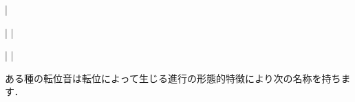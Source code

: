 \documentclass[dvipdfmx,uplatex,b5paper,openany,jbase=12Q,nomag*,textwidth-limit=44%
               ]{gachimuchi}
\begin{document}
\begin{floatMusic}[width=0.9\linewidth]
  \nostartrule%
  \Startpiece%
  \NOtes{}%
  \en\NOTes%
  \en\doublebar%
  \NOtes{}%
  \en\NOTes%
  \en\doublebar%
  \NOtes{}%
    \zcharsl{*}%
  \en\doublebar%
  \NOtes{}%
    \zcharsl{*}%
  \en\doublebar%
  \NOtes{}%
  \en\bar%
  \NOTes{}%
  \en\setdoublebar%
  \endpiece%
\end{floatMusic}

\begin{floatMusic}[width=0.9\linewidth]
  \nostartrule%
  \Startpiece%
  \NOTes{}%
  \en\NOtes%
  \en\bar%
  \NOTEs{}%
  \en\doublebar%
  \NOTes{}%
  \en\NOtes%
  \en\bar%
  \NOTEs{}%
  \en\setdoublebar%
  \endpiece%
\end{floatMusic}

\begin{floatMusic}[width=0.9\linewidth]
  \nostartrule%
  \Startpiece%
  \NOtes{}%
  \en\NOtes{}%
  \en\bar%
  \NOtes{}%
  \en\NOtes{}%
  \en\bar%
  \NOTes{}%
    \Mryaku\sk
  \en\setdoublebar%
  \endpiece%
\end{floatMusic}

ある種の転位音は転位によって生じる進行の形態的特徴により次の名称を持ちます．
\end{document}
